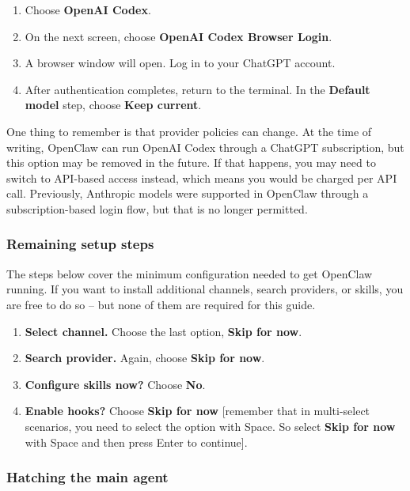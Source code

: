 \documentclass[12pt, a4paper]{article}
\begin{document}
\begin{enumerate}[leftmargin=1.5em]
\item Choose \textbf{OpenAI Codex}.
\item On the next screen, choose \textbf{OpenAI Codex Browser Login}.
\item A browser window will open. Log in to your ChatGPT account.
\item After authentication completes, return to the terminal. In the \textbf{Default model} step, choose \textbf{Keep current}.
\end{enumerate}

\begin{warnbox}
One thing to remember is that provider policies can change. At the time of writing, OpenClaw can run OpenAI Codex through a ChatGPT subscription, but this option may be removed in the future. If that happens, you may need to switch to API-based access instead, which means you would be charged per API call. Previously, Anthropic models were supported in OpenClaw through a subscription-based login flow, but that is no longer permitted.
\end{warnbox}

\subsubsection{Remaining setup steps}

\begin{notebox}
The steps below cover the minimum configuration needed to get OpenClaw running. If you want to install additional channels, search providers, or skills, you are free to do so -- but none of them are required for this guide.
\end{notebox}

\begin{enumerate}[leftmargin=1.5em]
\item \textbf{Select channel.} Choose the last option, \textbf{Skip for now}.
\item \textbf{Search provider.} Again, choose \textbf{Skip for now}.
\item \textbf{Configure skills now?} Choose \textbf{No}.
\item \textbf{Enable hooks?} Choose \textbf{Skip for now} [remember that in multi-select scenarios, you need to select the option with Space. So select \textbf{Skip for now} with Space and then press Enter to continue].
\end{enumerate}

\subsubsection{Hatching the main agent}
\end{document}
